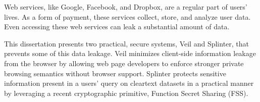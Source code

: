 Web services, like Google, Facebook, and Dropbox, 
are a regular part of users' lives. 
As a form of payment, these services
collect, store, and analyze user data.
Even accessing these web services can leak a substantial
amount of data. 

This dissertation presents two practical,
secure systems, Veil and Splinter, that
prevents some of this data leakage. Veil minimizes
client-side information leakage from the browser by allowing
web page developers to enforce stronger private browsing 
semantics without browser support. Splinter protects
sensitive information present in a users' query on cleartext datasets
in a practical manner by leveraging a recent cryptographic
primitive, Function Secret Sharing (FSS).